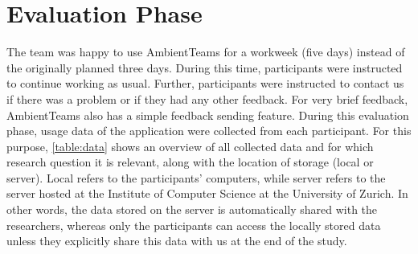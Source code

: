 \section{Evaluation Phase}
\label{section:evaluation}
The team was happy to use AmbientTeams for a workweek (five days) instead of the originally planned three days. During this time, participants were instructed to continue working as usual. Further, participants were instructed to contact us if there was a problem or if they had any other feedback. For very brief feedback, AmbientTeams also has a simple feedback sending feature. During this evaluation phase, usage data of the application were collected from each participant. For this purpose, \autoref{table:data} shows an overview of all collected data and for which research question it is relevant, along with the location of storage (local or server). Local refers to the participants' computers, while server refers to the server hosted at the Institute of Computer Science at the University of Zurich. In other words, the data stored on the server is automatically shared with the researchers, whereas only the participants can access the locally stored data unless they explicitly share this data with us at the end of the study.

